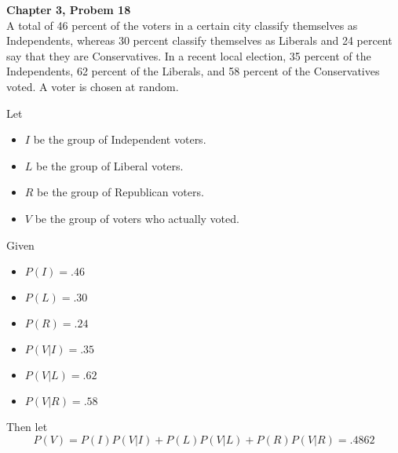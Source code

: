 \documentclass{article}
\begin{document}
\begin{spacing}{1.1}
\maketitle

\newpage
\begin{homeworkProblem}
  {\bf Chapter 3, Probem 18}\\
  A total of 46 percent of the voters in a certain city classify 
  themselves as Independents, whereas 30 percent classify themselves 
  as Liberals and 24 percent say that they are Conservatives. In a 
  recent local election, 35 percent of the Independents, 62 percent 
  of the Liberals, and 58 percent of the Conservatives voted. A voter 
  is chosen at random. 

  Let
  \begin{itemize}
    \item $I$ be the group of Independent voters.
    \item $L$ be the group of Liberal voters.
    \item $R$ be the group of Republican voters.
    \item $V$ be the group of voters who actually voted.
  \end{itemize}
  Given
  \begin{itemize}
    \item $P( I) = .46$ 
    \item $P( L) = .30$ 
    \item $P( R) = .24$
    \item $P( V|I) = .35$
    \item $P( V|L) = .62$
    \item $P( V|R) = .58$
  \end{itemize}
  Then let
    \[P( V) = P( I) P( V|I) + P( L) P( V|L) + P( R) P( V|R) = .4862\]


\end{homeworkProblem}
\end{spacing}
\end{document}
